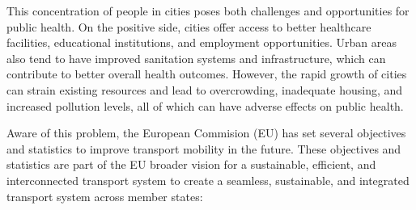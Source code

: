 This concentration of people in cities poses both challenges and opportunities for public health. On the positive side, cities offer access to better healthcare facilities, educational institutions, and employment opportunities. Urban areas also tend to have improved sanitation systems and infrastructure, which can contribute to better overall health outcomes. However, the rapid growth of cities can strain existing resources and lead to overcrowding, inadequate housing, and increased pollution levels, all of which can have adverse effects on public health.

Aware of this problem, the European Commision (EU) has set several objectives and statistics to improve transport mobility in the future. These objectives and statistics are part of the EU broader vision for a sustainable, efficient, and interconnected transport system to create a seamless, sustainable, and integrated transport system across member states:

